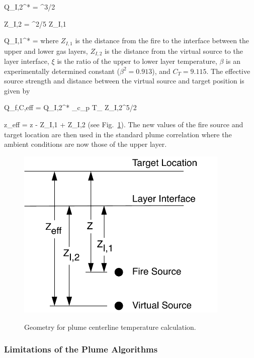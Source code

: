 \be Q_{I,2}^* = ^{3/2} \ee

\be Z_{I,2} = ^{2/5} Z_{I,1}  \ee

\be Q_{I,1}^* =   \ee
where $Z_{I,1}$ is the distance from the fire to the interface between the upper and lower gas layers, $Z_{I,2}$ is the distance from the virtual source to the layer interface, $\xi$ is the ratio of the upper to lower layer temperature, $\beta$ is an experimentally determined constant \cite{Zukoski:1981} ($\beta^2 = 0.913$), and $C_T = 9.115$.  The effective source strength and distance between the virtual source and target position is given by

\be Q_{f,C,eff} = Q_{I,2}^* \rho_\infty c_{p\infty} T_\infty {} Z_{I,2}^{5/2}  \ee

\be z_{eff} = z - Z_{I,1} + Z_{I,2} \ee
(see Fig.~\ref{fig:Plume_Temp_Notation}). The new values of the fire source and  target location are then used in the standard plume correlation where the ambient conditions are now those of the upper layer.
\begin{figure}
\begin{center}
\includegraphics[width=4.0in]{FIGURES/Theory/Plume_Temp_Notation}\\
\end{center}
\caption{Geometry for plume centerline temperature calculation.}
 \label{fig:Plume_Temp_Notation}
\end{figure}

\subsubsection{Limitations of the Plume Algorithms} \label{sec:plumelimits}

